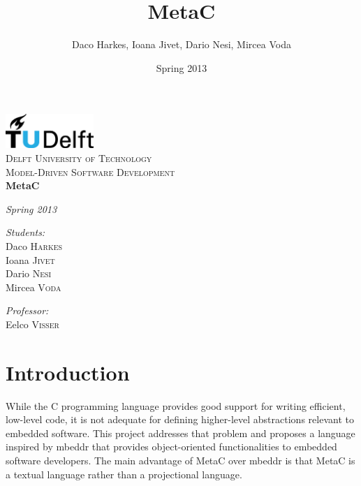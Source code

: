 \documentclass[a4paper,10pt,titlepage]{report}
\title{MetaC}
\author{Daco Harkes, Ioana Jivet, Dario Nesi, Mircea Voda}
\date{Spring 2013}
\begin{document}
\begin{titlepage}
\begin{center}


\includegraphics[width=0.25\textwidth]{pics/logo.eps}~\\[1cm]

\textsc{\LARGE Delft University of Technology}\\[4.5cm]

\textsc{\Large Model-Driven Software Development}\\[1cm]

{ \Huge \bfseries{MetaC}\\[1.5cm]}

\emph{Spring 2013}\\[4cm]

\begin{minipage}{0.4\textwidth}
\begin{flushleft} \large
\emph{Students:}\\
Daco \textsc{Harkes}\\
Ioana \textsc{Jivet}\\
Dario \textsc{Nesi}\\
Mircea \textsc{Voda}\\
\end{flushleft}
\end{minipage}
\begin{minipage}{0.4\textwidth}
\begin{flushright} \large
\emph{Professor:} \\
Eelco \textsc{Visser}
\end{flushright}
\end{minipage}

\vfill

\end{center}
\end{titlepage}



\chapter{Introduction}

While the C programming language provides good support for writing efficient, low-level code, it is not adequate for defining higher-level abstractions relevant to embedded software. This project addresses that problem and proposes a language inspired by mbeddr \cite{voelter2012mbeddr} that provides object-oriented functionalities to embedded software developers. The main advantage of MetaC over mbeddr is that MetaC is a textual language rather than a projectional language.
\end{document}
